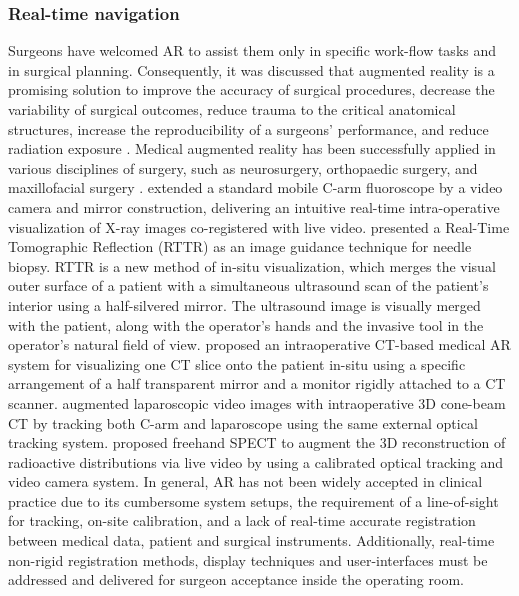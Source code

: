 \subsubsection{Real-time navigation}
Surgeons have welcomed AR to assist them only in specific work-flow tasks and in surgical planning. Consequently, it was discussed that augmented reality is a promising solution to improve the accuracy of surgical procedures, decrease the variability of surgical outcomes, reduce trauma to the critical anatomical structures, increase the reproducibility of a surgeons' performance, and reduce radiation exposure \cite{Navab2012a}. 
Medical augmented reality has been successfully applied in various disciplines of surgery, such as neurosurgery, orthopaedic surgery, and maxillofacial surgery \cite{Fallavollita2016}.
\citet{Navab2010} extended a standard mobile C-arm fluoroscope by a video camera and mirror construction, delivering an intuitive real-time intra-operative visualization of X-ray images co-registered with live video.
\citet{Stetten2005} presented a Real-Time Tomographic Reflection (RTTR) as an image guidance technique for needle biopsy. RTTR is a new method of in-situ visualization, which merges the visual outer surface of a patient with a simultaneous ultrasound scan of the patient’s interior using a half-silvered mirror. The ultrasound image is visually merged with the patient, along with the operator's hands and the invasive tool in the operator’s natural field of view. 
\citet{Fichtinger2005} proposed an intraoperative CT-based medical AR system for visualizing one CT slice onto the patient in-situ using a specific arrangement of a half transparent mirror and a monitor rigidly attached to a CT scanner.  
\citet{Feuerstein2008} augmented laparoscopic video images with intraoperative 3D cone-beam CT by tracking both C-arm and laparoscope using the same external optical tracking system. 
\citet{Wendler2007a} proposed freehand SPECT to augment the 3D reconstruction of radioactive distributions via live video by using a calibrated optical tracking and video camera system.  
In general, AR has not been widely accepted in clinical practice due to its cumbersome system setups, the requirement of a line-of-sight for tracking, on-site calibration, and a lack of real-time accurate registration between medical data, patient and surgical instruments. Additionally, real-time non-rigid registration methods, display techniques and user-interfaces must be addressed and delivered for surgeon acceptance inside the operating room.


